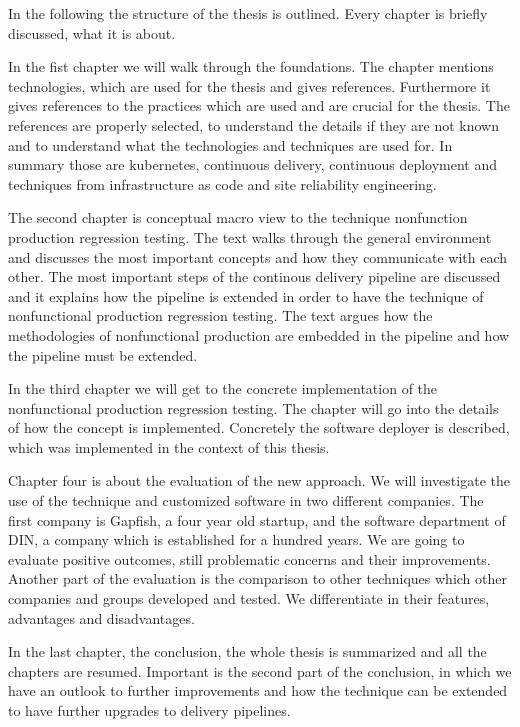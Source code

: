 In the following the structure of the thesis is outlined. Every chapter is briefly discussed, what it is about.

In the fist chapter we will walk through the foundations. The chapter mentions technologies, which are used for the thesis and gives references. Furthermore it gives references to the practices which are used and are crucial for the thesis. The references are properly selected, to understand the details if they are not known and to understand what the technologies and techniques are used for. In summary those are kubernetes, continuous delivery, continuous deployment and techniques from infrastructure as code and site reliability engineering.

The second chapter is conceptual macro view to the technique nonfunction production regression testing. The text walks through the general environment and discusses the most important concepts and how they communicate with each other. The most important steps of the continous delivery pipeline are discussed and it explains how the pipeline is extended in order to have the technique of nonfunctional production regression testing. The text argues how the methodologies of nonfunctional production are embedded in the pipeline and how the pipeline must be extended.

In the third chapter we will get to the concrete implementation of the nonfunctional production regression testing. The chapter will go into the details of how the concept is implemented. Concretely the software deployer is described, which was implemented in the context of this thesis.

Chapter four is about the evaluation of the new approach. We will investigate the use of the technique and customized software in two different companies. The first company is Gapfish, a four year old startup, and the software department of DIN, a company which is established for a hundred years. We are going to evaluate positive outcomes, still problematic concerns and their improvements. Another part of the evaluation is the comparison to other techniques which other companies and groups developed and tested. We differentiate in their features, advantages and disadvantages.

In the last chapter, the conclusion, the whole thesis is summarized and all the chapters are resumed. Important is the second part of the conclusion, in which we have an outlook to further improvements and how the technique can be extended to have further upgrades to delivery pipelines.

